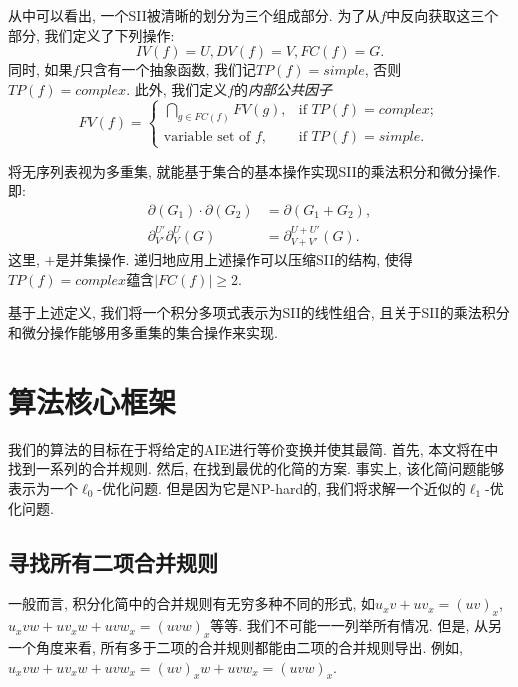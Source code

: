 从中可以看出, 一个SII被清晰的划分为三个组成部分. 为了从$f$中反向获取这三个部分, 我们定义了下列操作:
\begin{equation}
IV(f)=U,DV(f)=V,FC(f)=G.
\end{equation}
同时, 如果$f$只含有一个抽象函数, 我们记$TP(f)=simple$, 否则$TP(f)=complex$. 此外, 我们定义$f$的\emph{内部公共因子}
\begin{equation}    
FV(f)=\left\{
\begin{array}{cl}
\bigcap\limits_{g\in FC(f)}{FV(g)}, &\text{if }TP(f)=complex;\\ 
\text{variable set of } f,          &\text{if }TP(f)=simple.
\end{array}
\right.
\end{equation}

将无序列表视为多重集, 就能基于集合的基本操作实现SII的乘法\D 积分和微分操作. 即:
\begin{equation}
\begin{split}
\partial(G_1)\cdot\partial(G_2)&=\partial(G_1+G_2),\\
\partial^{U'}_{V'}\partial^{U}_{V}(G)&=\partial^{U+U'}_{V+V'}(G).
\end{split}
\label{ops}
\end{equation}
这里, $+$是并集操作. 递归地应用上述操作可以压缩SII的结构, 使得$TP(f)=complex$蕴含$|FC(f)|\ge 2$. 

基于上述定义, 我们将一个积分多项式表示为SII的线性组合, 且关于SII的乘法\D 积分和微分操作能够用多重集的集合操作来实现. 

\section{算法核心框架} \label{Simplify-03}
我们的算法的目标在于将给定的AIE进行等价变换并使其最简. 首先, 本文将在中找到一系列的合并规则. 然后, 在找到最优的化简的方案. 事实上, 该化简问题能够表示为一个$\ell_0$-优化问题. 但是因为它是NP-hard的, 我们将求解一个近似的$\ell_1$-优化问题. 


\subsection{寻找所有二项合并规则}\label{all_rules-03}
一般而言, 积分化简中的合并规则有无穷多种不同的形式, 如$u_x v + u v_x = (uv)_x$, $u_x v w+u v_x w + u v w_x = (uvw)_x$等等. 我们不可能一一列举所有情况. 但是, 从另一个角度来看, 所有多于二项的合并规则都能由二项的合并规则导出. 例如, $u_xvw+uv_xw+uvw_x=(uv)_xw+uvw_x=(uvw)_x$. 

